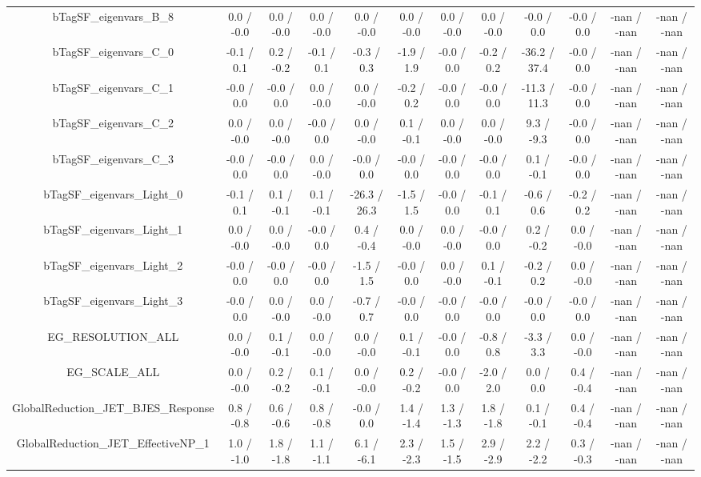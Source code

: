 \begin{table}[htbp]
\begin{center}
\begin{tabular}{|c|c|c|c|c|c|c|c|c|c|c|c|}
  bTagSF_eigenvars_B_8 & 0.0 / -0.0 & 0.0 / -0.0 & 0.0 / -0.0 & 0.0 / -0.0 & 0.0 / -0.0 & 0.0 / -0.0 & 0.0 / -0.0 & -0.0 / 0.0 & -0.0 / 0.0 & -nan / -nan & -nan / -nan \\ 
  bTagSF_eigenvars_C_0 & -0.1 / 0.1 & 0.2 / -0.2 & -0.1 / 0.1 & -0.3 / 0.3 & -1.9 / 1.9 & -0.0 / 0.0 & -0.2 / 0.2 & -36.2 / 37.4 & -0.0 / 0.0 & -nan / -nan & -nan / -nan \\ 
  bTagSF_eigenvars_C_1 & -0.0 / 0.0 & -0.0 / 0.0 & 0.0 / -0.0 & 0.0 / -0.0 & -0.2 / 0.2 & -0.0 / 0.0 & -0.0 / 0.0 & -11.3 / 11.3 & -0.0 / 0.0 & -nan / -nan & -nan / -nan \\ 
  bTagSF_eigenvars_C_2 & 0.0 / -0.0 & 0.0 / -0.0 & -0.0 / 0.0 & 0.0 / -0.0 & 0.1 / -0.1 & 0.0 / -0.0 & 0.0 / -0.0 & 9.3 / -9.3 & -0.0 / 0.0 & -nan / -nan & -nan / -nan \\ 
  bTagSF_eigenvars_C_3 & -0.0 / 0.0 & -0.0 / 0.0 & 0.0 / -0.0 & -0.0 / 0.0 & -0.0 / 0.0 & -0.0 / 0.0 & -0.0 / 0.0 & 0.1 / -0.1 & -0.0 / 0.0 & -nan / -nan & -nan / -nan \\ 
  bTagSF_eigenvars_Light_0 & -0.1 / 0.1 & 0.1 / -0.1 & 0.1 / -0.1 & -26.3 / 26.3 & -1.5 / 1.5 & -0.0 / 0.0 & -0.1 / 0.1 & -0.6 / 0.6 & -0.2 / 0.2 & -nan / -nan & -nan / -nan \\ 
  bTagSF_eigenvars_Light_1 & 0.0 / -0.0 & 0.0 / -0.0 & -0.0 / 0.0 & 0.4 / -0.4 & 0.0 / -0.0 & 0.0 / -0.0 & -0.0 / 0.0 & 0.2 / -0.2 & 0.0 / -0.0 & -nan / -nan & -nan / -nan \\ 
  bTagSF_eigenvars_Light_2 & -0.0 / 0.0 & -0.0 / 0.0 & -0.0 / 0.0 & -1.5 / 1.5 & -0.0 / 0.0 & 0.0 / -0.0 & 0.1 / -0.1 & -0.2 / 0.2 & 0.0 / -0.0 & -nan / -nan & -nan / -nan \\ 
  bTagSF_eigenvars_Light_3 & -0.0 / 0.0 & 0.0 / -0.0 & 0.0 / -0.0 & -0.7 / 0.7 & -0.0 / 0.0 & -0.0 / 0.0 & -0.0 / 0.0 & -0.0 / 0.0 & -0.0 / 0.0 & -nan / -nan & -nan / -nan \\ 
  EG_RESOLUTION_ALL & 0.0 / -0.0 & 0.1 / -0.1 & 0.0 / -0.0 & 0.0 / -0.0 & 0.1 / -0.1 & -0.0 / 0.0 & -0.8 / 0.8 & -3.3 / 3.3 & 0.0 / -0.0 & -nan / -nan & -nan / -nan \\ 
  EG_SCALE_ALL & 0.0 / -0.0 & 0.2 / -0.2 & 0.1 / -0.1 & 0.0 / -0.0 & 0.2 / -0.2 & -0.0 / 0.0 & -2.0 / 2.0 & 0.0 / 0.0 & 0.4 / -0.4 & -nan / -nan & -nan / -nan \\ 
  GlobalReduction_JET_BJES_Response & 0.8 / -0.8 & 0.6 / -0.6 & 0.8 / -0.8 & -0.0 / 0.0 & 1.4 / -1.4 & 1.3 / -1.3 & 1.8 / -1.8 & 0.1 / -0.1 & 0.4 / -0.4 & -nan / -nan & -nan / -nan \\ 
  GlobalReduction_JET_EffectiveNP_1 & 1.0 / -1.0 & 1.8 / -1.8 & 1.1 / -1.1 & 6.1 / -6.1 & 2.3 / -2.3 & 1.5 / -1.5 & 2.9 / -2.9 & 2.2 / -2.2 & 0.3 / -0.3 & -nan / -nan & -nan / -nan \\ 

\end{tabular}
\end{center}
\end{table}
